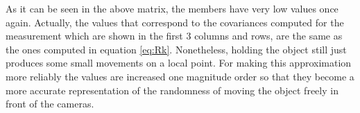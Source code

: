 As it can be seen in the above matrix, the members have very low values once again. Actually, the values that correspond to the covariances computed for the measurement which are shown in the first 3 columns and rows, are the same as the ones computed in equation \eqref{eq:Rk}.
Nonetheless, holding the object still just produces some small movements on a local point. For making this approximation more reliably the values are increased one magnitude order so that they become a more accurate representation of the randomness of moving the object freely in front of the cameras.

